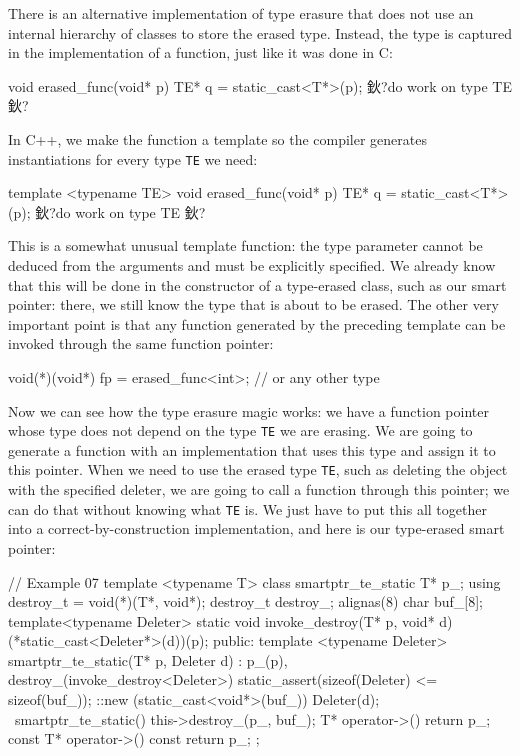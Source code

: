 There is an alternative implementation of type erasure that does not use an internal hierarchy of classes to store the erased type. Instead, the type is captured in the implementation of a function, just like it was done in C:

\begin{code}
void erased_func(void* p) {
  TE* q = static_cast<T*>(p);
  鈥?do work on type TE 鈥?
}
\end{code}

In C++, we make the function a template so the compiler generates instantiations for every type \texttt{TE} we need:

\begin{code}
template <typename TE> void erased_func(void* p) {
  TE* q = static_cast<T*>(p);
  鈥?do work on type TE 鈥?
}
\end{code}

This is a somewhat unusual template function: the type parameter cannot be deduced from the arguments and must be explicitly specified. We already know that this will be done in the constructor of a type-erased class, such as our smart pointer: there, we still know the type that is about to be erased. The other very important point is that any function generated by the preceding template can be invoked through the same function pointer:

\begin{code}
void(*)(void*) fp = erased_func<int>; // or any other type
\end{code}

Now we can see how the type erasure magic works: we have a function pointer whose type does not depend on the type \texttt{TE} we are erasing. We are going to generate a function with an implementation that uses this type and assign it to this pointer. When we need to use the erased type \texttt{TE}, such as deleting the object with the specified deleter, we are going to call a function through this pointer; we can do that without knowing what \texttt{TE} is. We just have to put this all together into a correct-by-construction implementation, and here is our type-erased smart pointer:

\begin{code}
// Example 07
template <typename T>
class smartptr_te_static {
  T* p_;
  using destroy_t = void(*)(T*, void*);
  destroy_t destroy_;
  alignas(8) char buf_[8];
  template<typename Deleter>
  static void invoke_destroy(T* p, void* d) {
    (*static_cast<Deleter*>(d))(p);
  }
  public:
  template <typename Deleter>
  smartptr_te_static(T* p, Deleter d)
    : p_(p), destroy_(invoke_destroy<Deleter>)
  {
    static_assert(sizeof(Deleter) <= sizeof(buf_));
    ::new (static_cast<void*>(buf_)) Deleter(d);
  }
  ~smartptr_te_static() {
    this->destroy_(p_, buf_);
  }
  T* operator->() { return p_; }
  const T* operator->() const { return p_; }
};
\end{code}

